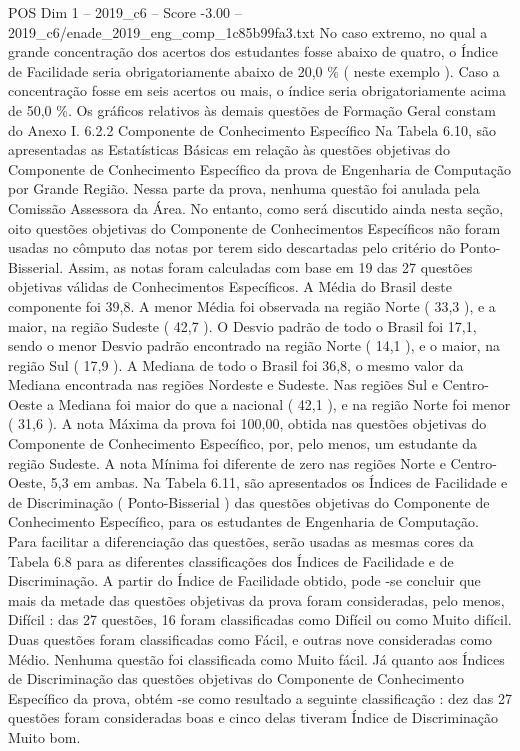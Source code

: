 \begin{textsample}{POS Dim 1 – 2019\_c6 – Score -3.00 – 2019\_c6/enade\_2019\_eng\_comp\_1c85b99fa3.txt}
No caso extremo, no qual a grande concentração dos acertos dos estudantes fosse abaixo de quatro, o Índice de Facilidade seria obrigatoriamente abaixo de 20,0 \% ( neste exemplo ).
Caso a concentração fosse em seis acertos ou mais, o índice seria obrigatoriamente acima de 50,0 \%.
Os gráficos relativos às demais questões de Formação Geral constam do Anexo I. 6.2.2 Componente de Conhecimento Específico Na Tabela 6.10, são apresentadas as Estatísticas Básicas em relação às questões objetivas do Componente de Conhecimento Específico da prova de Engenharia de Computação por Grande Região.
Nessa parte da prova, nenhuma questão foi anulada pela Comissão Assessora da Área.
No entanto, como será discutido ainda nesta seção, oito questões objetivas do Componente de Conhecimentos Específicos não foram usadas no cômputo das notas por terem sido descartadas pelo critério do Ponto-Bisserial.
Assim, as notas foram calculadas com base em 19 das 27 questões objetivas válidas de Conhecimentos Específicos.
A Média do Brasil deste componente foi 39,8.
A menor Média foi observada na região Norte ( 33,3 ), e a maior, na região Sudeste ( 42,7 ).
O Desvio padrão de todo o Brasil foi 17,1, sendo o menor Desvio padrão encontrado na região Norte ( 14,1 ), e o maior, na região Sul ( 17,9 ).
A Mediana de todo o Brasil foi 36,8, o mesmo valor da Mediana encontrada nas regiões Nordeste e Sudeste.
Nas regiões Sul e Centro-Oeste a Mediana foi maior do que a nacional ( 42,1 ), e na região Norte foi menor ( 31,6 ).
A nota Máxima da prova foi 100,00, obtida nas questões objetivas do Componente de Conhecimento Específico, por, pelo menos, um estudante da região Sudeste.
A nota Mínima foi diferente de zero nas regiões Norte e Centro-Oeste, 5,3 em ambas.
Na Tabela 6.11, são apresentados os Índices de Facilidade e de Discriminação ( Ponto-Bisserial ) das questões objetivas do Componente de Conhecimento Específico, para os estudantes de Engenharia de Computação.
Para facilitar a diferenciação das questões, serão usadas as mesmas cores da Tabela 6.8 para as diferentes classificações dos Índices de Facilidade e de Discriminação.
A partir do Índice de Facilidade obtido, pode -se concluir que mais da metade das questões objetivas da prova foram consideradas, pelo menos, Difícil : das 27 questões, 16 foram classificadas como Difícil ou como Muito difícil.
Duas questões foram classificadas como Fácil, e outras nove consideradas como Médio.
Nenhuma questão foi classificada como Muito fácil.
Já quanto aos Índices de Discriminação das questões objetivas do Componente de Conhecimento Específico da prova, obtém -se como resultado a seguinte classificação : dez das 27 questões foram consideradas boas e cinco delas tiveram Índice de Discriminação Muito bom.

\end{textsample}

